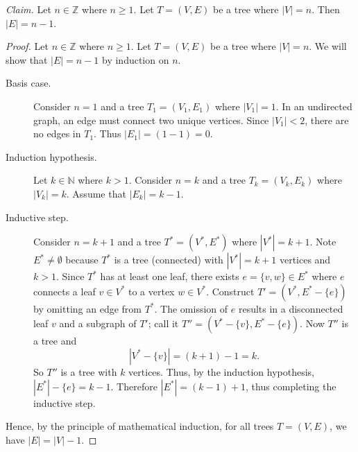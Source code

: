 \documentclass{article}
\newcommand{\Z}{\mathbb{Z}}
\newcommand{\N}{\mathbb{N}}
\theoremstyle{definition}
\begin{document}
\begin{solution}

\noindent\textit{Claim. }Let $n\in\Z$ where $n\geq 1$. Let $T=(V,E)$ be a tree where $|V|=n$. Then $|E|=n-1$. 
\begin{proof}
Let $n\in\Z$ where $n\geq 1$. Let $T=(V,E)$ be a tree where $|V|=n$. We will show that $|E|=n-1$ by induction on $n$.

\begin{description}
\item[Basis case. ]Consider $n=1$ and a tree $T_1=(V_1,E_1)$ where $|V_1|=1$. In an undirected graph, an edge must connect two unique vertices. Since $|V_1|<2$, there are no edges in $T_1$. Thus $|E_1|=(1-1)=0$.
\item[Induction hypothesis. ]Let $k\in\N$ where $k>1$. Consider $n=k$ and a tree $T_k=(V_k,E_k)$ where $|V_k|=k$. Assume that $|E_k|=k-1$.
\item[Inductive step. ]Consider $n=k+1$ and a tree $T^*=(V^*,E^*)$ where $|V^*|=k+1$. Note $E^*\neq\emptyset$ because $T^*$ is a tree (connected) with $|V^*|=k+1$ vertices and $k>1$. Since $T^*$ has at least one leaf, there exists $e=\{v,w\}\in E^*$ where $e$ connects a leaf $v\in V^*$ to a vertex $w\in V^*$. Construct $T'=(V^*,E^*-\{e\})$ by omitting an edge from $T^*$. The omission of $e$ results in a disconnected leaf $v$ and a subgraph of $T'$; call it $T''=(V^*-\{v\},E^*-\{e\})$. Now $T''$ is a tree and \[|V^*-\{v\}|=(k+1)-1=k.\] So $T''$ is a tree with $k$ vertices. Thus, by the induction hypothesis, $|E^*|-\{e\}=k-1$. Therefore $|E^*|=(k-1)+1$, thus completing the inductive step.
\end{description}
Hence, by the principle of mathematical induction, for all trees $T=(V,E)$, we have $|E|=|V|-1$.
\end{proof}
\end{solution}
\end{document}
